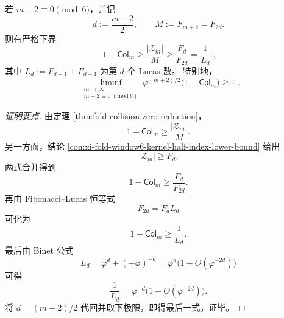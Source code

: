 \begin{conclusion}\label{con:xi-fold-window6-lucas-barrier-collision-gap}
若 \(m+2\equiv 0\pmod 6\)，并记
\[
d:=\frac{m+2}{2},
\qquad
M:=F_{m+2}=F_{2d}.
\]
则有严格下界
\[
\boxed{\;
1-\mathsf{Col}_m
\ge \frac{|\mathcal Z_m|}{M}
\ge \frac{F_d}{F_{2d}}
=\frac{1}{L_d}\;},
\]
其中 \(L_d:=F_{d-1}+F_{d+1}\) 为第 \(d\) 个 Lucas 数。
特别地，
\[
\boxed{\;
\liminf_{\substack{m\to\infty\\ m+2\equiv 0\ (\mathrm{mod}\ 6)}}
\varphi^{(m+2)/2}\bigl(1-\mathsf{Col}_m\bigr)\ge 1\; }.
\]
\end{conclusion}
\begin{proof}[证明要点]
由定理 \ref{thm:fold-collision-zero-reduction}，
\[
1-\mathsf{Col}_m\ge \frac{|\mathcal Z_m|}{M}.
\]
另一方面，结论 \ref{con:xi-fold-window6-kernel-half-index-lower-bound} 给出
\[
|\mathcal Z_m|\ge F_d.
\]
两式合并得到
\[
1-\mathsf{Col}_m\ge \frac{F_d}{F_{2d}}.
\]
再由 Fibonacci--Lucas 恒等式
\[
F_{2d}=F_dL_d
\]
可化为
\[
1-\mathsf{Col}_m\ge \frac{1}{L_d}.
\]
最后由 Binet 公式
\[
L_d=\varphi^d+(-\varphi)^{-d}
=\varphi^d\bigl(1+O(\varphi^{-2d})\bigr)
\]
可得
\[
\frac{1}{L_d}
=\varphi^{-d}\bigl(1+O(\varphi^{-2d})\bigr).
\]
将 \(d=(m+2)/2\) 代回并取下极限，即得最后一式。证毕。
\end{proof}
